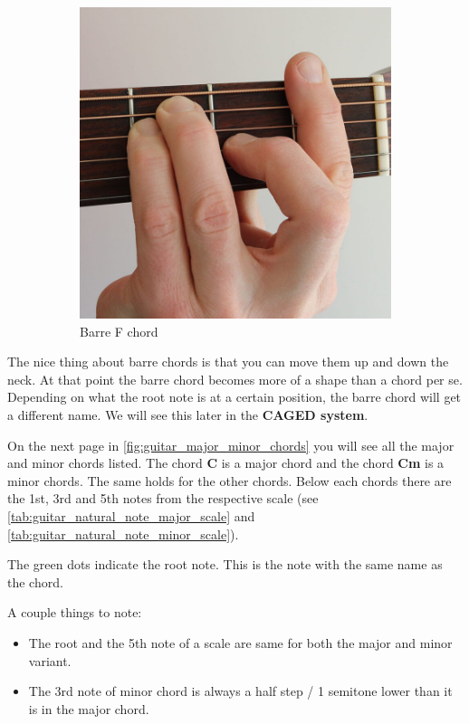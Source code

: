 \begin{figure}[h]
\begin{subfigure}[b]{0.45\textwidth}
		\includegraphics[width=\textwidth]{../../Images/F-major-barre-photo-768x768.jpg}
		\caption{Barre F chord \cite{BarreFChordHand}}
		\label{fig:guitar-barre-f-chord-hand-position}
	\end{subfigure}
	\caption{}
\end{figure}


The nice thing about barre chords is that you can move them up and down the neck. At that point the barre chord becomes more of a shape than a chord per se. Depending on what the root note is at a certain position, the barre chord will get a different name. We will see this later in the \textbf{CAGED system}.

On the next page in \autoref{fig:guitar_major_minor_chords} you will see all the major and minor chords listed. The chord \textbf{C} is a major chord and the chord \textbf{Cm} is a minor chords. The same holds for the other chords. Below each chords there are the 1st, 3rd and 5th notes from the respective scale (see \autoref{tab:guitar_natural_note_major_scale} and \autoref{tab:guitar_natural_note_minor_scale}).

The green dots indicate the root note. This is the note with the same name as the chord.

A couple things to note:

\begin{itemize}
	\item The root and the 5th note of a scale are same for both the major and minor variant.
	\item The 3rd note of minor chord is always a half step / 1 semitone lower than it is in the major chord.
\end{itemize}

